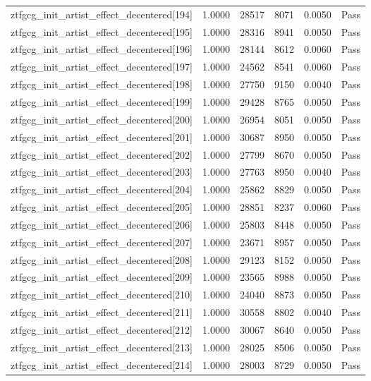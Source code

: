 \begin{table}[htbp]
\begin{tabular}{llrrll}
ztfgcg\_init\_artist\_effect\_decentered[194] & 1.0000 & 28517 & 8071 & 0.0050 & Pass \\
ztfgcg\_init\_artist\_effect\_decentered[195] & 1.0000 & 28316 & 8941 & 0.0050 & Pass \\
ztfgcg\_init\_artist\_effect\_decentered[196] & 1.0000 & 28144 & 8612 & 0.0060 & Pass \\
ztfgcg\_init\_artist\_effect\_decentered[197] & 1.0000 & 24562 & 8541 & 0.0060 & Pass \\
ztfgcg\_init\_artist\_effect\_decentered[198] & 1.0000 & 27750 & 9150 & 0.0040 & Pass \\
ztfgcg\_init\_artist\_effect\_decentered[199] & 1.0000 & 29428 & 8765 & 0.0050 & Pass \\
ztfgcg\_init\_artist\_effect\_decentered[200] & 1.0000 & 26954 & 8051 & 0.0050 & Pass \\
ztfgcg\_init\_artist\_effect\_decentered[201] & 1.0000 & 30687 & 8950 & 0.0050 & Pass \\
ztfgcg\_init\_artist\_effect\_decentered[202] & 1.0000 & 27799 & 8670 & 0.0050 & Pass \\
ztfgcg\_init\_artist\_effect\_decentered[203] & 1.0000 & 27763 & 8950 & 0.0040 & Pass \\
ztfgcg\_init\_artist\_effect\_decentered[204] & 1.0000 & 25862 & 8829 & 0.0050 & Pass \\
ztfgcg\_init\_artist\_effect\_decentered[205] & 1.0000 & 28851 & 8237 & 0.0060 & Pass \\
ztfgcg\_init\_artist\_effect\_decentered[206] & 1.0000 & 25803 & 8448 & 0.0050 & Pass \\
ztfgcg\_init\_artist\_effect\_decentered[207] & 1.0000 & 23671 & 8957 & 0.0050 & Pass \\
ztfgcg\_init\_artist\_effect\_decentered[208] & 1.0000 & 29123 & 8152 & 0.0050 & Pass \\
ztfgcg\_init\_artist\_effect\_decentered[209] & 1.0000 & 23565 & 8988 & 0.0050 & Pass \\
ztfgcg\_init\_artist\_effect\_decentered[210] & 1.0000 & 24040 & 8873 & 0.0050 & Pass \\
ztfgcg\_init\_artist\_effect\_decentered[211] & 1.0000 & 30558 & 8802 & 0.0040 & Pass \\
ztfgcg\_init\_artist\_effect\_decentered[212] & 1.0000 & 30067 & 8640 & 0.0050 & Pass \\
ztfgcg\_init\_artist\_effect\_decentered[213] & 1.0000 & 28025 & 8506 & 0.0050 & Pass \\
ztfgcg\_init\_artist\_effect\_decentered[214] & 1.0000 & 28003 & 8729 & 0.0050 & Pass \\

\end{tabular}
\end{table}

